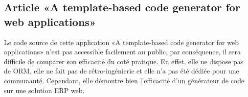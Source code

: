 \subsection{Article «A template-based code generator for web applications»}
Le code source de cette application «A template-based code generator for web applications» n’est pas accessible facilement au public, par conséquence, il sera difficile de comparer son efficacité du coté pratique. En effet, elle ne dispose pas de ORM, elle ne fait pas de rétro-ingénierie et elle n'a pas été dédiée pour une communauté. Cependant, elle démontre bien l'efficacité d'un générateur de code sur une solution ERP web.
